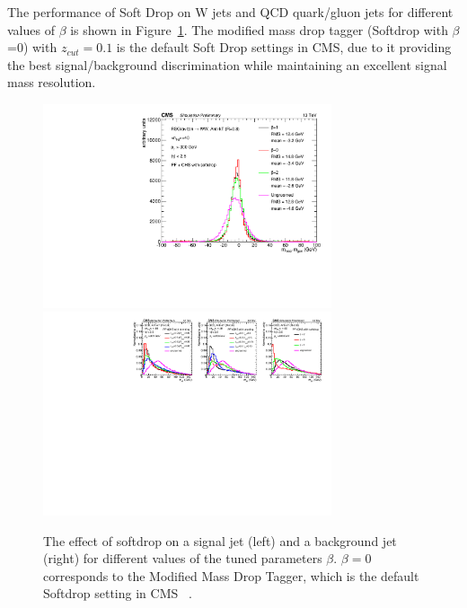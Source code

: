 The performance of Soft Drop on W jets and QCD quark/gluon jets for different values of $\beta$ is shown in Figure~\ref{fig:objreco:softdrop}. The modified mass drop tagger (Softdrop with $\beta$=0) with $z_{cut} = 0.1$ is the default Soft Drop settings in CMS, due to it providing the best signal/background discrimination while maintaining an excellent signal mass resolution. 
\begin{figure}[h!] 
    \centering 
    \includegraphics[height=6cm]{figures/event_reconstruction/sig_sd.pdf}
    \includegraphics[height=6cm]{figures/event_reconstruction/bkg_softdrop-noData.pdf}
     \caption{The effect of softdrop on a signal jet (left) and a background jet (right) for different values of the tuned parameters $\beta$. $\beta=0$ corresponds to the Modified Mass Drop Tagger, which is the default Softdrop setting in CMS ~\cite{CMS-PAS-JME-14-001}.}
     \label{fig:objreco:softdrop}
 \end{figure}

